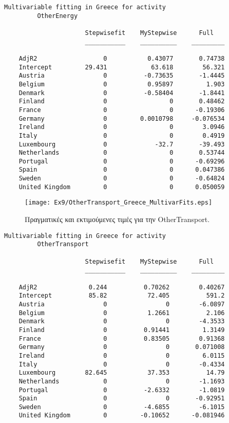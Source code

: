 \documentclass[11pt]{scrartcl} %
\begin{document}
\begin{Verbatim}[fontsize=\small]
Multivariable fitting in Greece for activity
 	 	 OtherEnergy

                      Stepwisefit    MyStepwise      Full   
                      ___________    __________    _________

    AdjR2                  0           0.43077       0.74738
    Intercept         29.431            63.618        56.321
    Austria                0          -0.73635       -1.4445
    Belgium                0           0.95897         1.903
    Denmark                0          -0.58404       -1.8441
    Finland                0                 0       0.48462
    France                 0                 0      -0.19306
    Germany                0         0.0010798     -0.076534
    Ireland                0                 0        3.0946
    Italy                  0                 0        0.4919
    Luxembourg             0             -32.7       -39.493
    Netherlands            0                 0       0.53744
    Portugal               0                 0      -0.69296
    Spain                  0                 0      0.047386
    Sweden                 0                 0      -0.64824
    United Kingdom         0                 0      0.050059
\end{Verbatim}



\begin{figure}[H]
 
	\centering
	\texttt{[image: Ex9/OtherTransport\_Greece\_MultivarFits.eps]}	
\caption{Πραγματικές και εκτιμούμενες τιμές για την OtherTransport.}
\label{fig:z98}
\end{figure}



\begin{Verbatim}[fontsize=\small]
Multivariable fitting in Greece for activity
 	 	 OtherTransport

                      Stepwisefit    MyStepwise      Full   
                      ___________    __________    _________

    AdjR2              0.244          0.70262        0.40267
    Intercept          85.82           72.405          591.2
    Austria                0                0        -6.0897
    Belgium                0           1.2661          2.106
    Denmark                0                0        -4.3533
    Finland                0          0.91441         1.3149
    France                 0          0.83505        0.91368
    Germany                0                0       0.071008
    Ireland                0                0         6.0115
    Italy                  0                0        -0.4334
    Luxembourg        82.645           37.353          14.79
    Netherlands            0                0        -1.1693
    Portugal               0          -2.6332        -1.0819
    Spain                  0                0       -0.92951
    Sweden                 0          -4.6855        -6.1015
    United Kingdom         0         -0.10652      -0.081946
\end{Verbatim}
\end{document}
